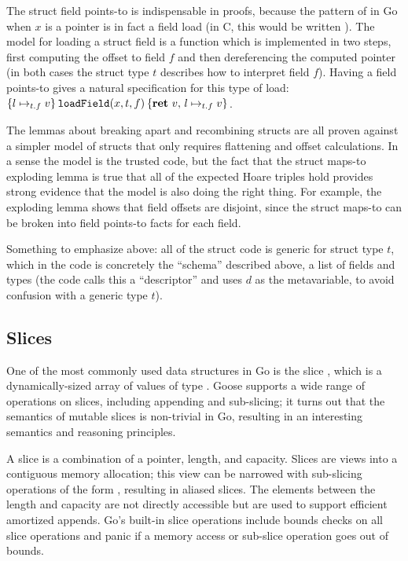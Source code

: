 The struct field points-to is indispensable in proofs, because the
pattern of  in Go when $x$ is a pointer is in fact a field
load (in C, this would be written ). The model
for loading a struct field is a function 
which is implemented in two steps, first computing the offset to field
$f$ and then dereferencing the computed pointer (in both cases the struct type $t$
describes how to interpret field $f$). Having a field points-to gives
a natural specification for this type of load:
$\hoare{l \mapsto_{t.f} v}{\mathtt{loadField}(x, t, f)}{\Ret{v} l \mapsto_{t.f} v}$.

The lemmas about breaking apart and recombining structs are all proven
against a simpler model of structs that only requires flattening and
offset calculations. In a sense the model is the trusted code, but the
fact that the struct maps-to exploding lemma is true that all of the
expected Hoare triples hold provides strong evidence that the model is
also doing the right thing. For example, the exploding lemma shows that
field offsets are disjoint, since the struct maps-to can be broken into
field points-to facts for each field.

Something to emphasize above: all of the struct code is generic for
struct type $t$, which in the code is concretely the ``schema''
described above, a list of fields and types (the code calls this a
``descriptor'' and uses $d$ as the metavariable, to avoid confusion
with a generic type $t$).

\subsection{Slices}

One of the most commonly used data structures in Go is the slice
, which is a dynamically-sized array of values of type
. Goose supports a wide range of operations on slices,
including appending and sub-slicing; it turns out that the semantics of
mutable slices is non-trivial in Go, resulting in an interesting
semantics and reasoning principles.

A slice is a combination of a pointer, length, and capacity. Slices are
views into a contiguous memory allocation; this view can be narrowed
with sub-slicing operations of the form , resulting
in aliased slices. The elements between the length and capacity are not
directly accessible but are used to support efficient amortized appends.
Go's built-in slice operations include bounds checks on all slice
operations and panic if a memory access or sub-slice operation goes out
of bounds.

